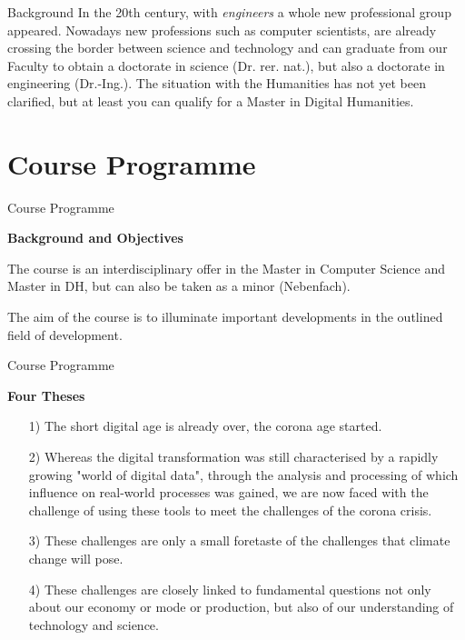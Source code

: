 \documentclass{beamer}
\newcommand{\ueberschrift}[1]{\begin{center}\bf #1\end{center}}
\begin{document}
\begin{frame}{Background}
In the 20th century, with \emph{engineers} a whole new professional group
appeared.  Nowadays new professions such as computer scientists, are already
crossing the border between science and technology and can graduate from our
Faculty to obtain a doctorate in science (Dr. rer. nat.), but also a doctorate
in engineering (Dr.-Ing.).  The situation with the Humanities has not yet been
clarified, but at least you can qualify for a Master in Digital Humanities.
\end{frame}

\section{Course Programme}
\begin{frame}{Course Programme}

\ueberschrift{Background and Objectives}

The course is an interdisciplinary offer in the Master in Computer Science and
Master in DH, but can also be taken as a minor (Nebenfach). 

The aim of the course is to illuminate important developments in the outlined
field of development.  
\end{frame}

\begin{frame}{Course Programme}
\ueberschrift{Four Theses}
\begin{itemize}
\item[1)] The short digital age is already over, the corona age started.
\item[2)] Whereas the digital transformation was still characterised by a
  rapidly growing "world of digital data", through the analysis and processing
  of which influence on real-world processes was gained, we are now faced with
  the challenge of using these tools to meet the challenges of the corona
  crisis.
\item[3)] These challenges are only a small foretaste of the challenges that
  climate change will pose.
\item[4)] These challenges are closely linked to fundamental questions not
  only about our economy or mode or production, but also of our understanding
  of technology and science.
\end{itemize}
\end{frame}
\end{document}
